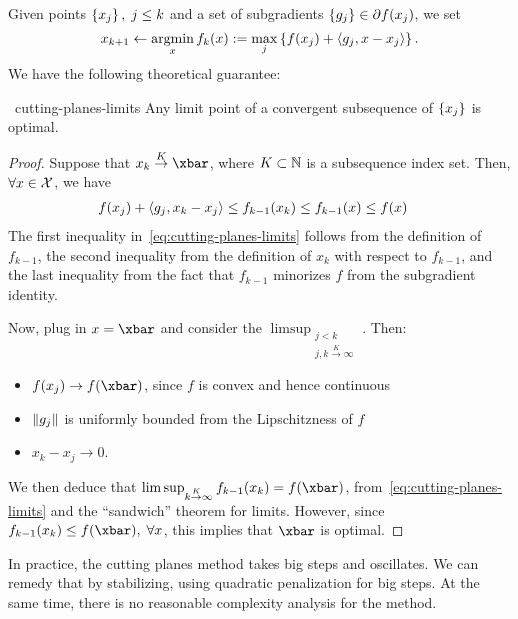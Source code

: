 Given points $\left\{ x_j \right\}, \; j \leq k$ and a set of subgradients $\left\{ g_j \right\} \in
\partial f(x_j)$, we set
\[
	x_{k+1} \gets \operatorname*{argmin}_x f_k(x) :=
	\max_j \left\{  f(x_j) + \left\langle g_j, x - x_j \right\rangle  \right\}.
\]
We have the following theoretical guarantee:
\begin{ctheorem}{~}{cutting-planes-limits}
	Any limit point of a convergent subsequence of $\left\{ x_j \right\}$ is optimal.
\end{ctheorem}
\begin{proof}
	Suppose that $x_k \overset{K}{\to} \xbar$, where $K \subset \mathbb{N}$ is a
	subsequence index set. Then, $\forall x \in \mathcal{X}$, we have
	\begin{align}
		f(x_j) + \left\langle g_j, x_k - x_j \right\rangle &\leq f_{k-1}(x_k) \leq f_{k-1}(x)
		\leq f(x) \label{eq:cutting-planes-limits}
	\end{align}
	The first inequality in~\cref{eq:cutting-planes-limits} follows from the
	definition of $f_{k-1}$, the second inequality from the definition of $x_k$
	with respect to $f_{k-1}$, and the last inequality from the fact that
	$f_{k-1}$ minorizes $f$ from the subgradient identity.

	Now, plug in $x = \xbar$ and consider the $\limsup_{\substack{j < k \\ j, k
	\overset{K}{\to} \infty}}$. Then:
	\begin{itemize}
		\item $f(x_j) \to f(\xbar)$, since $f$ is convex and hence continuous
		\item $\left \| g_j \right \|$ is uniformly bounded from the Lipschitzness of $f$
		\item $x_k - x_j \to 0$.
	\end{itemize}
	We then deduce that $\limsup_{k \overset{K}{\to} \infty} f_{k-1}(x_k) =
	f(\xbar)$, from~\cref{eq:cutting-planes-limits} and the ``sandwich''
	theorem for limits. However, since $f_{k-1}(x_k) \leq f(\xbar), \; \forall
	x$, this implies that $\xbar$ is optimal.
\end{proof}

In practice, the cutting planes method takes big steps and oscillates. We can
remedy that by stabilizing, using quadratic penalization for big steps. At the
same time, there is no reasonable complexity analysis for the method.

